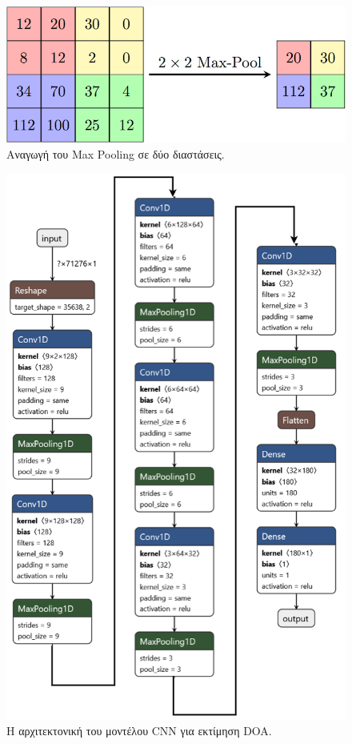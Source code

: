 \begin{figure}[h]
  \centering
  \includegraphics[width=\textwidth]{images/max_pooling_2d.png}
  \caption{Αναγωγή του Max Pooling σε δύο διαστάσεις.}
  \label{fig:max_pooling_2d}
\end{figure}

\begin{figure}[h]
  \centering
  \includegraphics[width=\textwidth]{images/CNN_Arch.png}
  \caption{Η αρχιτεκτονική του μοντέλου CNN για εκτίμηση DOA.}
  \label{fig:CNN_Arch}
\end{figure}